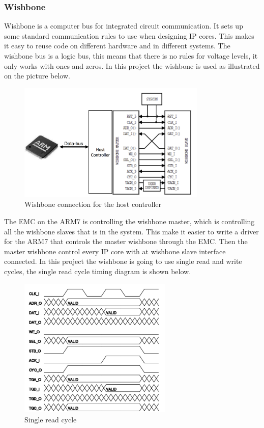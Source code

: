 \subsubsection{Wishbone}
Wishbone is a computer bus for integrated circuit communication. It sets up some standard communication rules to use when designing IP cores. This makes it easy to reuse code on different hardware and in different systems. The wishbone bus is a logic bus, this means that there is no rules for voltage levels, it only works with ones and zeros. In this project the wishbone is used as illustrated on the picture below.
\begin{figure}[H]
	\begin{centering}
		 \includegraphics[width=0.8\textwidth]{images/typical_usage.png}
		\caption{Wishbone connection for the host controller}
	\end{centering}
\end{figure}
The EMC on the ARM7 is controlling the wishbone master, which is controlling all the wishbone slaves that is in the system. This make it easier to write a driver for the ARM7 that controls the master wishbone through the EMC. Then the master wishbone control every IP core with at wishbone slave interface connected. In this project the wishbone is going to use single read and write cycles, the single read cycle timing diagram is shown below.
\begin{figure}[H]
	\begin{centering}
		 \includegraphics[width=0.65\textwidth]{images/wb_single_read.png}
		\caption{Single read cycle}
	\end{centering}
\end{figure}
